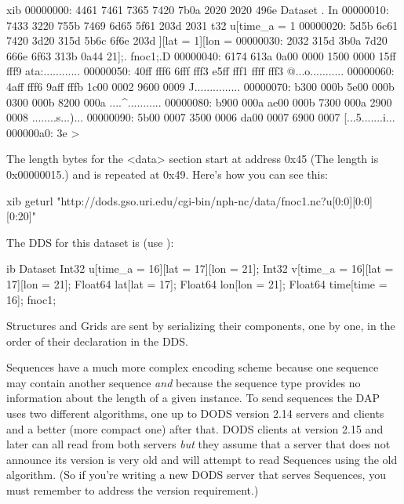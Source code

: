 \begin{vcode}{xib}
00000000: 4461 7461 7365 7420 7b0a 2020 2020 496e  Dataset {.    In
00000010: 7433 3220 755b 7469 6d65 5f61 203d 2031  t32 u[time_a = 1
00000020: 5d5b 6c61 7420 3d20 315d 5b6c 6f6e 203d  ][lat = 1][lon =
00000030: 2032 315d 3b0a 7d20 666e 6f63 313b 0a44   21];.} fnoc1;.D
00000040: 6174 613a 0a00 0000 1500 0000 15ff fff9  ata:............
00000050: 40ff fff6 6fff fff3 e5ff fff1 ffff fff3  @...o...........
00000060: 4aff fff6 9aff fffb 1c00 0002 9600 0009  J...............
00000070: b300 000b 5e00 000b 0300 000b 8200 000a  ....^...........
00000080: b900 000a ae00 000b 7300 000a 2900 0008  ........s...)...
00000090: 5b00 0007 3500 0006 da00 0007 6900 0007  [...5.......i...
000000a0: 3e                                       >
\end{vcode}

The length bytes for the <data> section start at address 0x45 (The
length is 0x00000015.) and is repeated at 0x49.  Here's how you can
see this:

\begin{vcode}{xib}
geturl "http://dods.gso.uri.edu/cgi-bin/nph-nc/data/fnoc1.nc?u[0:0][0:0][0:20]"
\end{vcode}

The DDS for this dataset is (use ):

\begin{vcode}{ib}
Dataset {
    Int32 u[time_a = 16][lat = 17][lon = 21];
    Int32 v[time_a = 16][lat = 17][lon = 21];
    Float64 lat[lat = 17];
    Float64 lon[lon = 21];
    Float64 time[time = 16];
} fnoc1;
\end{vcode}

Structures and Grids are sent by serializing their components, one by
one, in the order of their declaration in the DDS.

Sequences have a much more complex encoding scheme because one
sequence may contain another sequence \emph{and} because the sequence
type provides no information about the length of a given instance.  To
send sequences the DAP uses two different algorithms, one up to DODS
version 2.14 servers and clients and a better (more compact one) after
that.  DODS clients at version 2.15 and later can all read from both
servers \emph{but} they assume that a server that does not announce
its version is very old and will attempt to read Sequences using the
old algorithm.  (So if you're writing a new DODS server that serves
Sequences, you must remember to address the version requirement.)

